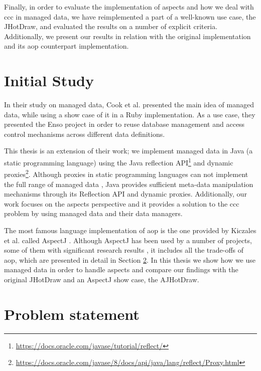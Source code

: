 Finally, in order to evaluate the implementation of aspects and how we deal with \ac{ccc} in managed data, we have reimplemented a part of a well-known use case, the JHotDraw, and evaluated the results on a number of explicit criteria.
Additionally, we present our results in relation with the original implementation and its \ac{aop} counterpart implementation.

\section{Initial Study}\label{Initial Study}
In their study on managed data, Cook et al. \cite{loh2012managed} presented the main idea of managed data, while using a show case of it in a Ruby implementation. 
As a use case, they presented the Enso project in order to reuse database management and  access control mechanisms across different data definitions.

This thesis is an extension of their work; we implement managed data in Java (a static programming language) using the Java reflection API\footnote{\url{https://docs.oracle.com/javase/tutorial/reflect/}} and dynamic proxies\footnote{\url{https://docs.oracle.com/javase/8/docs/api/java/lang/reflect/Proxy.html}}. 
Although proxies in static programming languages can not implement the full range of managed data \cite{loh2012managed}, Java provides sufficient meta-data manipulation mechanisms through its Reflection API \cite{forman2004java} and dynamic proxies. 
Additionally, our work focuses on the aspects perspective and it provides a solution to the \ac{ccc} problem by using managed data and their data managers.

The most famous language implementation of \ac{aop} is the one provided by Kiczales et al. called AspectJ \cite{kiczales2001overview}. 
Although AspectJ has been used by a number of projects, some of them with significant research results \cite{hannemann2002design} \cite{marinajhotdraw}, it includes all the trade-offs of \ac{aop}, which are presented in detail in Section \ref{Problem statement}.
In this thesis we show how we use managed data in order to handle aspects and compare our findings with the original JHotDraw and an AspectJ show case, the AJHotDraw.

\section{Problem statement}\label{Problem statement}


